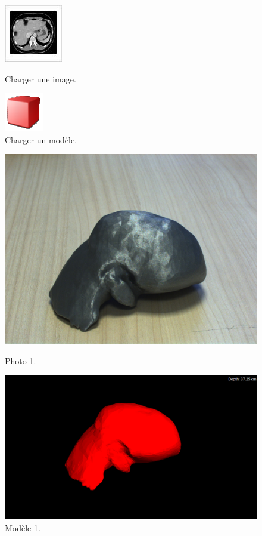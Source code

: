 \documentclass[12pt]{report}
\begin{document}
\begin{appendices}
\begin{figure}[H]
\centerline{\includegraphics[scale = 0.9]{img/icons/picture.jpg}}
\caption{Charger une image.}
\label{picture}
\endminipage\hfill
{}
\centerline{\includegraphics[scale = 1.4]{img/icons/load.png}}
\caption{Charger un modèle.}
\label{model}
\endminipage
\end{figure}

\begin{figure}[H]
\centerline{\includegraphics[scale = 0.1]{img/Photo1.jpg}}
\caption{Photo 1.}
\endminipage\hfill
{}
\centerline{\includegraphics[scale = 0.17]{img/Model1.png}}
\caption{Modèle 1.}
\endminipage
\end{figure}


\end{appendices}
\end{document}
